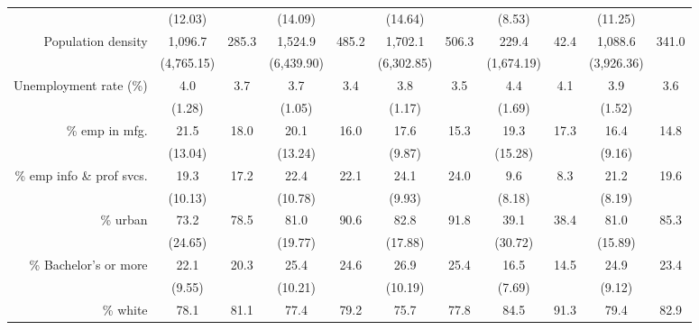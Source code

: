 \begin{tabular}{r*{5}{c}*{5}{c}}
                    &     (12.03)&            &     (14.09)&            &     (14.64)&            &      (8.53)&            &     (11.25)&            \\
Population density  &     1,096.7&       285.3&     1,524.9&       485.2&     1,702.1&       506.3&       229.4&        42.4&     1,088.6&       341.0\\
                    &  (4,765.15)&            &  (6,439.90)&            &  (6,302.85)&            &  (1,674.19)&            &  (3,926.36)&            \\
Unemployment rate (\%)&         4.0&         3.7&         3.7&         3.4&         3.8&         3.5&         4.4&         4.1&         3.9&         3.6\\
                    &      (1.28)&            &      (1.05)&            &      (1.17)&            &      (1.69)&            &      (1.52)&            \\
\% emp in mfg.      &        21.5&        18.0&        20.1&        16.0&        17.6&        15.3&        19.3&        17.3&        16.4&        14.8\\
                    &     (13.04)&            &     (13.24)&            &      (9.87)&            &     (15.28)&            &      (9.16)&            \\
\% emp info \& prof svcs.&        19.3&        17.2&        22.4&        22.1&        24.1&        24.0&         9.6&         8.3&        21.2&        19.6\\
                    &     (10.13)&            &     (10.78)&            &      (9.93)&            &      (8.18)&            &      (8.19)&            \\
\% urban            &        73.2&        78.5&        81.0&        90.6&        82.8&        91.8&        39.1&        38.4&        81.0&        85.3\\
                    &     (24.65)&            &     (19.77)&            &     (17.88)&            &     (30.72)&            &     (15.89)&            \\
\% Bachelor's or more&        22.1&        20.3&        25.4&        24.6&        26.9&        25.4&        16.5&        14.5&        24.9&        23.4\\
                    &      (9.55)&            &     (10.21)&            &     (10.19)&            &      (7.69)&            &      (9.12)&            \\
\% white            &        78.1&        81.1&        77.4&        79.2&        75.7&        77.8&        84.5&        91.3&        79.4&        82.9\\

\end{tabular}
